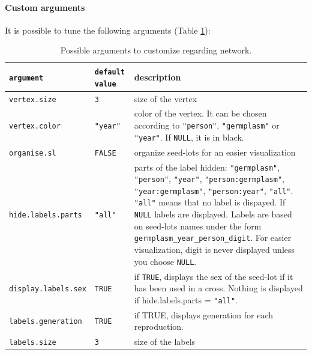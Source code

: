 \documentclass{article}\usepackage[]{graphicx}\usepackage[]{color}
\begin{document}
\paragraph{Custom arguments}

It is possible to tune the following arguments (Table \ref{custom.network}):


\begin{center}
\begin{table}[H]
\begin{tabular}{ p{} p{} p{} }
\hline
\texttt{argument} & \texttt{default value} & description \\
\hline

\texttt{vertex.size} & \texttt{3} &  size of the vertex \\

\texttt{vertex.color} & \texttt{"year"} & color of the vertex. 
It can be chosen according to  \texttt{"person"}, \texttt{"germplasm"} or \texttt{"year"}. 
If \texttt{NULL}, it is in black. \\

\texttt{organise.sl} & \texttt{FALSE} & organize seed-lots for an easier visualization \\

\texttt{hide.labels.parts} & \texttt{"all"} & parts of the label hidden: \texttt{"germplasm"}, \texttt{"person"}, \texttt{"year"}, \texttt{"person:germplasm"}, \texttt{"year:germplasm"}, \texttt{"person:year"}, \texttt{"all"}. 
\texttt{"all"} means that no label is dispayed. 
If \texttt{NULL} labels are displayed. Labels are based on seed-lots names under the form \texttt{germplasm\_year\_person\_digit}.
For easier visualization, digit is never displayed unless you choose \texttt{NULL}.
\\

\texttt{display.labels.sex} & \texttt{TRUE} & if \texttt{TRUE}, displays the sex of the seed-lot if it has been used in a cross. Nothing is displayed if hide.labels.parts = \texttt{"all"}. \\

\texttt{labels.generation} & \texttt{TRUE} & if TRUE, displays generation for each reproduction. \\

\texttt{labels.size} & \texttt{3} & size of the labels \\
\hline
\end{tabular}
\caption{Possible arguments to customize regarding network.}
\label{custom.network}
\end{table}
\end{center}
\end{document}

